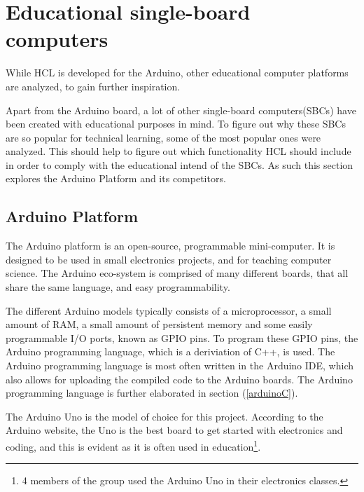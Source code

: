
\section{Educational single-board computers}
While HCL is developed for the Arduino, other educational computer platforms are analyzed, to gain further inspiration.

Apart from the Arduino board, a lot of other single-board computers(SBCs) have been created with educational purposes in mind.
To figure out why these SBCs are so popular for technical learning, some of the most popular ones were analyzed.
This should help to figure out which functionality HCL should include in order to comply with the educational intend of the SBCs\cite{SBC}.
As such this section explores the Arduino Platform and its competitors.

\subsection{Arduino Platform}
The Arduino platform is an open-source, programmable mini-computer\cite{ArFAQ}.
It is designed to be used in small electronics projects, and for teaching computer science.
The Arduino eco-system is comprised of many different boards, that all share the same language, and easy programmability.

The different Arduino models typically consists of a microprocessor, a small amount of RAM, a small amount of persistent memory and some easily programmable I/O ports, known as GPIO pins.
To program these GPIO pins, the Arduino programming language, which is a deriviation of C++, is used.
The Arduino programming language is most often written in the Arduino IDE, which also allows for uploading the compiled code to the Arduino boards.
The Arduino programming language is further elaborated in section (\ref{arduinoC}).

The Arduino Uno is the model of choice for this project.
According to the Arduino website, the Uno is the best board to get started with electronics and coding, and this is evident as it is often used in education\footnote{4 members of the group used the Arduino Uno in their electronics classes.}\cite{ArduinoUno}.

